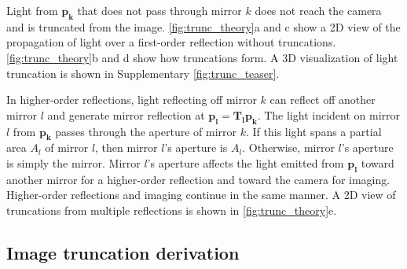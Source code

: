 Light from $\bm{p_k}$ that does not pass through 
mirror $k$ does not reach the camera and is truncated from the image.
\cref{fig:trunc_theory}a and c show a 2D view of the propagation of light over a first-order reflection without truncations.
\cref{fig:trunc_theory}b and d show how truncations form.
A 3D visualization of light truncation is shown in Supplementary \cref*{fig:trunc_teaser}.




In higher-order reflections, light reflecting off mirror $k$ can 
reflect off another mirror $l$ and generate mirror reflection 
at $\bm{p_l}=\bm{T_l} \bm{p_k}$.
The light incident on mirror $l$ from $\bm{p_k}$ passes through the aperture 
of mirror $k$.
If this light spans a partial area $A_l$ of mirror $l$, then mirror $l$'s aperture is $A_l$.
Otherwise, mirror $l$'s aperture is simply the mirror.
Mirror $l$'s aperture affects the light emitted from $\bm{p_l}$ toward another 
mirror for a higher-order reflection and toward the camera for imaging.
Higher-order reflections and imaging continue in the same manner.
A 2D view of truncations from multiple reflections is shown in \cref{fig:trunc_theory}e.


\subsection{Image truncation derivation} \label{sec:image_truncations}

